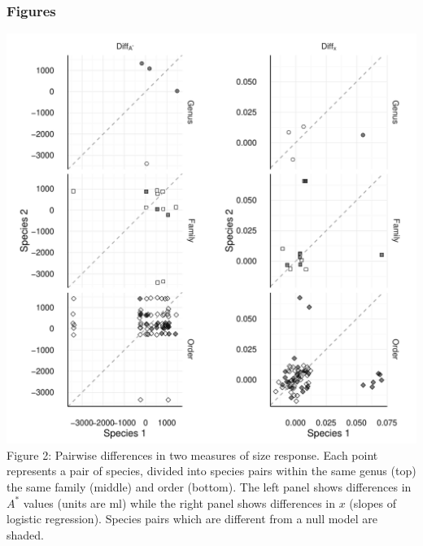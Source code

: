 \subsubsection{Figures}\label{figures}

\includegraphics[width=5.5in]{figures/pairwise_astars.pdf} Figure 2: Pairwise
differences in two measures of size response. Each point represents a
pair of species, divided into species pairs within the same genus (top)
the same family (middle) and order (bottom). The left panel shows
differences in \(A^{*}\) values (units are ml) while the right panel
shows differences in \(x\) (slopes of logistic regression). Species
pairs which are different from a null model are shaded.

